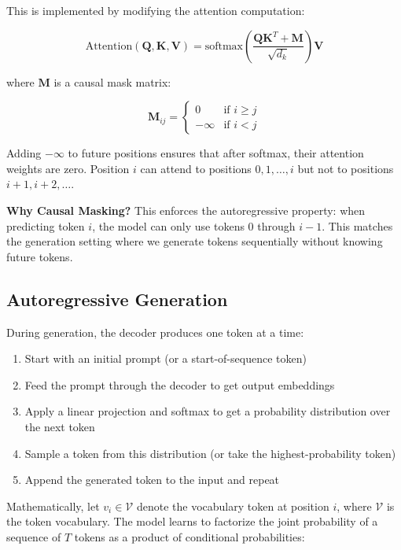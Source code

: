 \documentclass{book}
\begin{document}
This is implemented by modifying the attention computation:

\begin{equation}
\text{Attention}(\mathbf{Q}, \mathbf{K}, \mathbf{V}) = \text{softmax}\left(\frac{\mathbf{Q}\mathbf{K}^T + \mathbf{M}}{\sqrt{d_k}}\right) \mathbf{V}
\end{equation}

where $\mathbf{M}$ is a causal mask matrix:

\begin{equation}
\mathbf{M}_{ij} = \begin{cases}
0 & \text{if } i \geq j \\
-\infty & \text{if } i < j
\end{cases}
\end{equation}

Adding $-\infty$ to future positions ensures that after softmax, their attention weights are zero. Position $i$ can attend to positions $0, 1, \ldots, i$ but not to positions $i+1, i+2, \ldots$.

\textbf{Why Causal Masking?} This enforces the autoregressive property: when predicting token $i$, the model can only use tokens $0$ through $i-1$. This matches the generation setting where we generate tokens sequentially without knowing future tokens.

\subsection{Autoregressive Generation}

During generation, the decoder produces one token at a time:

\begin{enumerate}
\item Start with an initial prompt (or a start-of-sequence token)
\item Feed the prompt through the decoder to get output embeddings
\item Apply a linear projection and softmax to get a probability distribution
      over the next token
\item Sample a token from this distribution (or take the highest-probability
      token)
\item Append the generated token to the input and repeat
\end{enumerate}

Mathematically, let $v_i \in \mathcal{V}$ denote the vocabulary token at
position $i$, where $\mathcal{V}$ is the token vocabulary. The model learns to
factorize the joint probability of a sequence of $T$ tokens as a product of
conditional probabilities:
\end{document}
